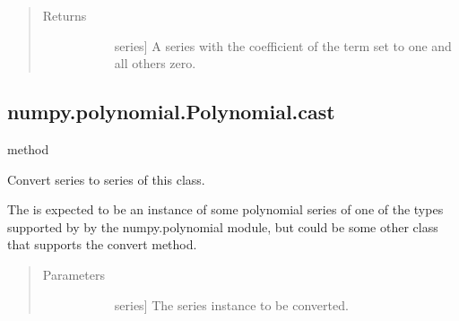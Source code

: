\documentclass[letterpaper,10pt,english]{sphinxmanual}
\begin{document}
\begin{fulllineitems}
\begin{fulllineitems}
\begin{quote}
\begin{description}
\begin{description}
\end{description}

\item[{Returns}] \leavevmode\begin{description}
\item[{}] \leavevmode{[}series{]}
A series with the coefficient of the  term set to one and
all others zero.

\end{description}

\end{description}\end{quote}

\end{fulllineitems}



\subsection{numpy.polynomial.Polynomial.cast}
\label{\detokenize{generated/generated/numpy.polynomial.Polynomial.cast:numpy-polynomial-polynomial-cast}}\label{\detokenize{generated/generated/numpy.polynomial.Polynomial.cast::doc}}
method

\begin{fulllineitems}
\label{\detokenize{generated/generated/numpy.polynomial.Polynomial.cast:numpy.polynomial.Polynomial.cast}}
Convert series to series of this class.

The  is expected to be an instance of some polynomial
series of one of the types supported by by the numpy.polynomial
module, but could be some other class that supports the convert
method.

\begin{quote}\begin{description}
\item[{Parameters}] \leavevmode\begin{description}
\item[{}] \leavevmode{[}series{]}
The series instance to be converted.


\end{description}
\end{description}
\end{quote}
\end{fulllineitems}
\end{fulllineitems}
\end{document}
